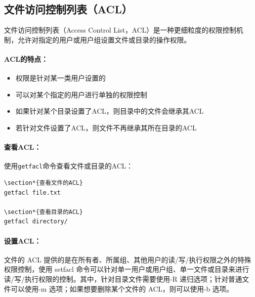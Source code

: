 \documentclass[12pt,UTF8]{ctexbook}
\begin{document}
\subsection{文件访问控制列表（ACL）}
文件访问控制列表（Access Control List，ACL）是一种更细粒度的权限控制机制，允许对指定的用户或用户组设置文件或目录的操作权限。

\paragraph{ACL的特点：}
\begin{itemize}
    \item 权限是针对某一类用户设置的
    \item 可以对某个指定的用户进行单独的权限控制
    \item 如果针对某个目录设置了ACL，则目录中的文件会继承其ACL
    \item 若针对文件设置了ACL，则文件不再继承其所在目录的ACL
\end{itemize}

\paragraph{查看ACL：}
使用\verb+getfacl+命令查看文件或目录的ACL：
\begin{verbatim}
\section*{查看文件的ACL}
getfacl file.txt

\section*{查看目录的ACL}
getfacl directory/
\end{verbatim}

\paragraph{设置ACL：}
文件的 ACL 提供的是在所有者、所属组、其他用户的读/写/执行权限之外的特殊权限控制，使用 setfacl 命令可以针对单一用户或用户组、单一文件或目录来进行读/写/执行权限的控制。其中，针对目录文件需要使用-R 递归选项；针对普通文件可以使用-m 选项；如果想要删除某个文件的 ACL，则可以使用-b 选项。
\end{document}
